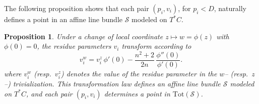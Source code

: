 \documentclass[twoside, 11pt]{article}
\numberwithin{equation}{section}
\theoremstyle{theorem}
\numberwithin{theorem}{section}
\newtheorem{proposition}[proposition]{Proposition}
\theoremstyle{definition}
\begin{document}
The following proposition shows that each pair \((p_i, v_i)\), for \(p_i < D\), naturally defines a point in an
affine line bundle \(\mathcal{S}\) modeled on \(T^*C\).
\begin{proposition}\label{p: def twist cotanbun}
Under a change of local coordinate \(z \mapsto w = \phi(z)\) with \(\phi(0)=0\), 
the residue parameters \(v_i\) transform according to
\begin{equation}\label{e:transition for affine bundle}
   v_i^{w}
=
v_i^{z}\,\phi'(0)
-
\frac{n^2+2}{2n}\,
\frac{\phi''(0)}{\phi'(0)} .
\end{equation}
where \(v_i^{w}\) (resp.\ \(v_i^{z}\)) denotes the value of the residue parameter 
in the \(w\)– (resp.\ \(z\)–) trivialization.  
This transformation law defines an affine line bundle \(\mathcal{S}\) modeled on \(T^*C\), 
and each pair \((p_i, v_i)\) determines a point in \(\mathrm{Tot}(\mathcal{S})\).
\end{proposition}
\end{document}
